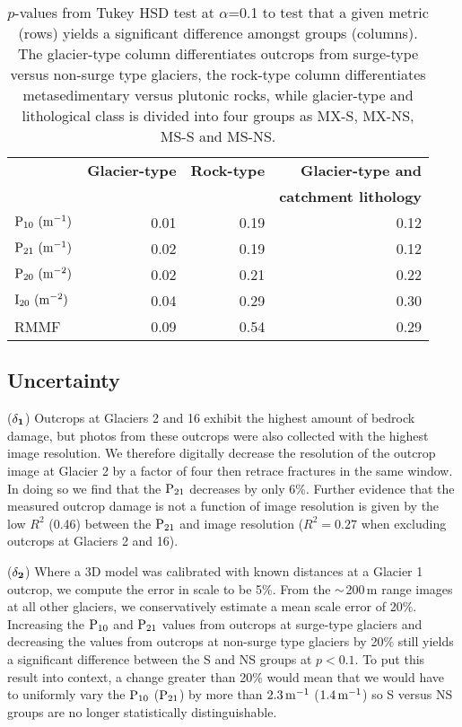 \documentclass[draft,linenumbers]{agujournal}
\begin{document}
\begin{table}
\begin{tabular}{lrrr}
\hline

&\textbf{Glacier-type} & \textbf{Rock-type} & \textbf{Glacier-type and} \\
& & & \textbf{catchment lithology}\\
\hline
$\rm{P_{10}\,\,(m^{-1})}$ & 0.01 & 0.19 & 0.12 \\
$\rm{P_{21}\,\, (m^{-1})}$ & 0.02& 0.19 & 0.12 \\
$\rm{P_{20}\,\, (m^{-2})}$ &0.02 & 0.21 & 0.22 \\
$\rm{I_{20} \,\,(m^{-2})}$ & 0.04&0.29 & 0.30 \\
RMMF & 0.09 & 0.54& 0.29 \\
\hline

\end{tabular}
\caption{$p$-values from Tukey HSD test at $\alpha$=0.1 to test that a given metric (rows) yields a significant difference amongst groups (columns). The glacier-type column differentiates outcrops from surge-type versus non-surge type glaciers, the rock-type column differentiates metasedimentary versus plutonic rocks, while glacier-type and lithological class is divided into four groups as MX-S, MX-NS, MS-S and MS-NS.}
\label{tab2}
\end{table}

\subsection{Uncertainty}

($\rm \bf \delta_1$) Outcrops at Glaciers 2 and 16 exhibit the highest amount of bedrock damage, but photos from these outcrops were also collected with the highest image resolution. We therefore digitally decrease the resolution of the outcrop image at Glacier 2 by a factor of four then retrace fractures in the same window. In doing so we find that the $\rm P_{21}$ decreases by only 6\%. Further evidence that the measured outcrop damage is not a function of image resolution is given by the low $R^2$ (0.46) between the $\rm P_{21}$ and image resolution ($R^2=0.27$ when excluding outcrops at Glaciers 2 and 16). 


($\rm \bf \delta_2$) Where a 3D model was calibrated with known distances at a Glacier 1 outcrop, we compute the error in scale to be 5\%. From the $\rm \sim$200\,m range images at all other glaciers, we conservatively estimate a mean scale error of 20\%. Increasing the $\rm P_{10}$ and $\rm P_{21}$ values from outcrops at surge-type glaciers and decreasing the values from outcrops at non-surge type glaciers by 20\% still yields a significant difference between the S and NS groups at $p<0.1$. To put this result into context, a change greater than 20\% would mean that we would have to uniformly vary the $\rm P_{10}$ ($\rm P_{21}$) by more than $\rm 2.3\,m^{-1}$ ($\rm 1.4\,m^{-1}$) so S versus NS groups are no longer statistically distinguishable. 
\end{document}
